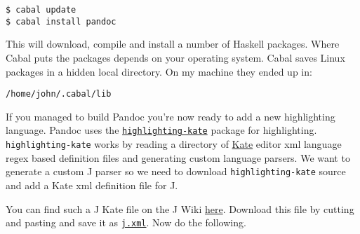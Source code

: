 \begin{tcolorbox}[breakable, size=fbox, boxrule=1pt, pad at break*=1mm,colback=cellbackground, colframe=cellborder]
\begin{verbatim}
$ cabal update
$ cabal install pandoc
\end{verbatim}
\end{tcolorbox}

This will download, compile and install a number of Haskell packages.
Where Cabal puts the packages depends on your operating system. Cabal
saves Linux packages in a hidden local directory. On my machine they
ended up in:

\begin{tcolorbox}[breakable, size=fbox, boxrule=1pt, pad at break*=1mm,colback=cellbackground, colframe=cellborder]
\begin{verbatim}
/home/john/.cabal/lib
\end{verbatim}
\end{tcolorbox}

If you managed to build Pandoc you're now ready to add a new
highlighting language. Pandoc uses the
\href{http://hackage.haskell.org/package/highlighting-kate-0.5.3.2}{\texttt{highlighting-kate}}
package for highlighting. \texttt{highlighting-kate} works by
reading a directory of \href{http://kate-editor.org/}{Kate} editor xml
language regex based definition files and generating custom language
parsers. We want to generate a custom J parser so we need to download
\texttt{highlighting-kate} source and add a Kate xml definition file for
J.

You can find such a J Kate file on the J Wiki
\href{http://www.jsoftware.com/jwiki/Guides/Syntax\%20Coloring?action=AttachFile\&do=view\&target=j.xml.txt}{here}.
Download this file by cutting and pasting and save it as \href{https://www.box.com/s/wvms2a1ws3il81kyb1qo}{\texttt{j.xml}}.
Now do the following.

